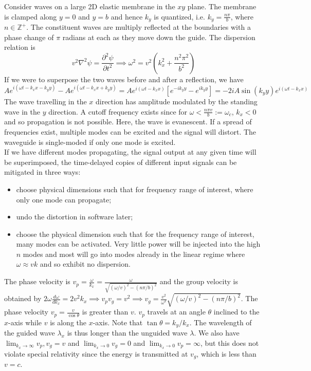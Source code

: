 \documentclass[a4paper]{article}
\begin{document}
\begin{Note}[Waveguide]
Consider waves on a large 2D elastic membrane in the $xy$ plane. The membrane is clamped along $y=0$ and $y=b$ and hence $k_y$ is quantized, i.e. $k_y=\frac{n\pi}{b}$, where $n\in\mathbb{Z}^+$. The constituent waves are multiply reflected at the boundaries with a phase change of $\pi$ radians at each as they move down the guide. The dispersion relation is $$v^2\nabla^2\psi=\frac{\partial^2\psi}{\partial t^2}\implies\omega^2=v^2(k_x^2+\frac{n^2\pi^2}{b^2})$$ 
If we were to superpose the two waves before and after a reflection, we have
$$Ae^{i(\omega t-k_xx-k_yy)}-Ae^{i(\omega t-k_xx+k_yy)}=Ae^{i(\omega t-k_xx)}[e^{-ik_yy}-e^{ik_yy}]=-2iA\sin(k_yy)e^{i(\omega t-k_xx)}$$
The wave travelling in the $x$ direction has amplitude modulated by the standing wave in the $y$ direction. A cutoff frequency exists since for $\omega<\frac{n\pi v}{b}:=\omega_c$, $k_x<0$ and so propagation is not possible. Here, the wave is evanescent. If a spread of frequencies exist, multiple modes can be excited and the signal will distort. The waveguide is single-moded if only one mode is excited.\\[5pt]
If we have different modes propagating, the signal output at any given time will be superimposed, the time-delayed copies of different input signals can be mitigated in three ways:
\begin{itemize}
    \item choose physical dimensions such that for frequency range of interest, where only one mode can propagate;
    \item undo the distortion in software later;
    \item choose the physical dimension such that for the frequency range of interest, many modes can be activated. Very little power will be injected into the high $n$ modes and most will go into modes already in the linear regime where $\omega\approx vk$ and so exhibit no dispersion.
\end{itemize}
The phase velocity is $v_p=\frac{\omega}{k_x}=\frac{\omega}{\sqrt{(\omega/v)^2-(n\pi/b)^2}}$ and the group velocity is obtained by $2\omega\frac{d\omega}{dk_x}=2v^2k_x\implies v_pv_g=v^2\implies v_g=\frac{v^2}{\omega^2}\sqrt{(\omega/v)^2-(n\pi/b)^2}$. The phase velocity $v_p=\frac{v}{\cos\theta}$ is greater than $v$. $v_p$ travels at an angle $\theta$ inclined to the $x$-axis while $v$ is along the $x$-axis. Note that $\tan\theta=k_y/k_x$. The wavelength of the guided wave $\lambda_x$ is thus longer than the unguided wave $\lambda$. We also have $\lim_{k_x\rightarrow\infty}v_p,v_g=v$ and $\lim_{k_x\rightarrow0}v_g=0$ and $\lim_{k_x\rightarrow0}v_p=\infty$, but this does not violate special relativity since the energy is transmitted at $v_g$, which is less than $v=c$.
\end{Note}
\end{document}
